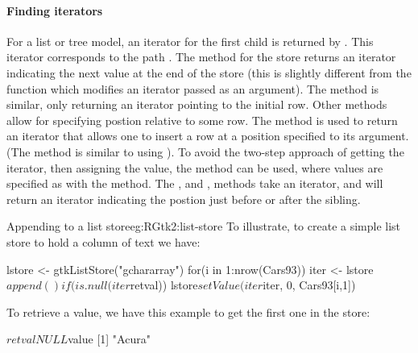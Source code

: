 \paragraph{Finding iterators}
For a list or tree model, an iterator for the first child is returned
by . This iterator corresponds to
the path .
The 
method for the store returns an iterator indicating the next value at
the end of the store (this is slightly different from the \GTK\/ function which
modifies an iterator passed as an argument).  The
 method is similar, only returning an
iterator pointing to the initial row.  Other methods allow for
specifying postion relative to some row. The
 method is used to return an iterator
that allows one to insert a row at a position specified to its
 argument. (The  method is similar to
using ). To avoid the two-step approach of getting the
iterator, then assigning the value, the method
 can be used, where values are
specified as with the  method.  The
, and
, methods take an iterator,
 and will return an iterator indicating the postion just
before or after the sibling.




\begin{example}{Appending to a list store}{eg:RGtk2:list-store}
  To illustrate, to create a simple list store to hold a column
of text we have:  
\begin{Schunk}
\begin{Sinput}
 lstore <- gtkListStore("gchararray")
 for(i in 1:nrow(Cars93)) {
   iter <- lstore$append()
   if(is.null(iter$retval)) 
     lstore$setValue(iter$iter, 0, Cars93[i,1])
 }
\end{Sinput}
\end{Schunk}
To retrieve a value, we have this example to get the first one in the store:
\begin{Schunk}
\begin{Soutput}
$retval
NULL

$value
[1] "Acura"
\end{Soutput}
\end{Schunk}
\end{example}

